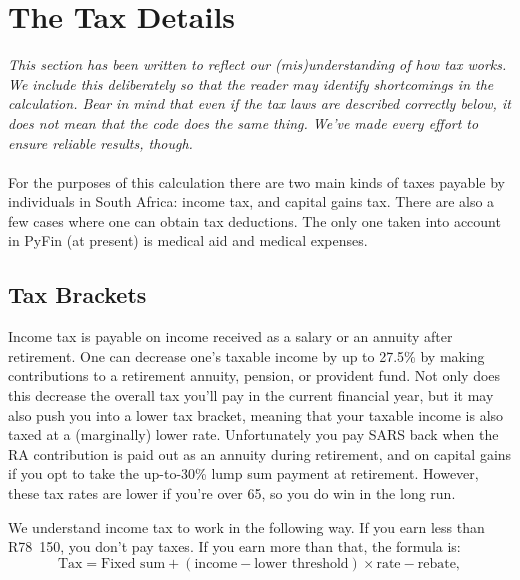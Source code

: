 \documentclass[a4paper, justified]{tufte-handout}
\begin{document}
\newpage
\section{The Tax Details}

\textit{This section has been written to reflect our (mis)understanding of how tax works. We include this deliberately so that the reader may identify shortcomings in the calculation. Bear in mind that even if the tax laws are described correctly below, it does not mean that the code does the same thing. We've made every effort to ensure reliable results, though.}\\\\
For the purposes of this calculation there are two main kinds of taxes payable by individuals in South Africa: income tax, and capital gains tax. There are also a few cases where one can obtain tax deductions. The only one taken into account in PyFin (at present) is medical aid and medical expenses.

\subsection{Tax Brackets}
Income tax is payable on income received as a salary or an annuity after retirement. One can decrease one's taxable income by up to 27.5\% by making contributions to a retirement annuity, pension, or provident fund. Not only does this decrease the overall tax you'll pay in the current financial year, but it may also push you into a lower tax bracket, meaning that your taxable income is also taxed at a (marginally) lower rate. Unfortunately you pay SARS back when the RA contribution is paid out as an annuity during retirement, and on capital gains if you opt to take the up-to-30\% lump sum payment at retirement. However, these tax rates are lower if you're over 65, so you do win in the long run.

We understand income tax to work in the following way. If you earn less than R78~150, you don't pay taxes. If you earn more than that, the formula is:
\begin{equation} \label{equ:IncomeTax}
\textrm{Tax} = \textrm{Fixed sum} + (\textrm{income} - \textrm{lower threshold})\times \textrm{rate} - \textrm{rebate},
\end{equation}
\end{document}

